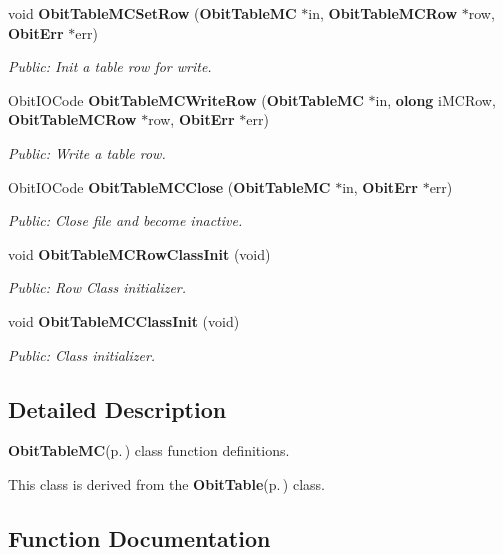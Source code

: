\begin{CompactItemize}
void {\bf Obit\-Table\-MCSet\-Row} ({\bf Obit\-Table\-MC} $\ast$in, {\bf Obit\-Table\-MCRow} $\ast$row, {\bf Obit\-Err} $\ast$err)
\begin{CompactList}\small\item\em Public: Init a table row for write. \item\end{CompactList}\item 
Obit\-IOCode {\bf Obit\-Table\-MCWrite\-Row} ({\bf Obit\-Table\-MC} $\ast$in, {\bf olong} i\-MCRow, {\bf Obit\-Table\-MCRow} $\ast$row, {\bf Obit\-Err} $\ast$err)
\begin{CompactList}\small\item\em Public: Write a table row. \item\end{CompactList}\item 
Obit\-IOCode {\bf Obit\-Table\-MCClose} ({\bf Obit\-Table\-MC} $\ast$in, {\bf Obit\-Err} $\ast$err)
\begin{CompactList}\small\item\em Public: Close file and become inactive. \item\end{CompactList}\item 
void {\bf Obit\-Table\-MCRow\-Class\-Init} (void)
\begin{CompactList}\small\item\em Public: Row Class initializer. \item\end{CompactList}\item 
void {\bf Obit\-Table\-MCClass\-Init} (void)
\begin{CompactList}\small\item\em Public: Class initializer. \item\end{CompactList}\end{CompactItemize}


\subsection{Detailed Description}
{\bf Obit\-Table\-MC}{\rm (p.\,\pageref{structObitTableMC})} class function definitions. 

This class is derived from the {\bf Obit\-Table}{\rm (p.\,\pageref{structObitTable})} class.

\subsection{Function Documentation}
